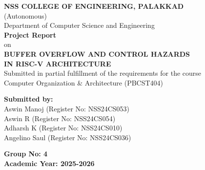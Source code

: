 \begin{center}
{\Large \bfseries NSS COLLEGE OF ENGINEERING, PALAKKAD}\\[0.5cm]
{\large (Autonomous)}\\[0.5cm]
{\large Department of Computer Science and Engineering}\\[2cm]

{\Large \bfseries Project Report}\\[0.5cm]
{\large on}\\[0.5cm]

{\LARGE \bfseries BUFFER OVERFLOW AND CONTROL HAZARDS\\ IN RISC-V ARCHITECTURE}\\[2cm]

{\large Submitted in partial fulfillment of the requirements for the course\\
Computer Organization \& Architecture (PBCST404)}\\[2cm]

\begin{flushleft}
{\large \bfseries Submitted by:}\\
Aswin Manoj \hspace{1cm} (Register No: NSS24CS053)\\
Aswin R \hspace{1.5cm} (Register No: NSS24CS054)\\
Adharsh K \hspace{1.2cm} (Register No: NSS24CS010)\\
Angelino Saul \hspace{0.7cm} (Register No: NSS24CS036)
\end{flushleft}

\vspace{1cm}
{\large \bfseries Group No: 4}\\[2cm]

{\large \bfseries Academic Year: 2025-2026}
\end{center}
\thispagestyle{empty}
\newpage

